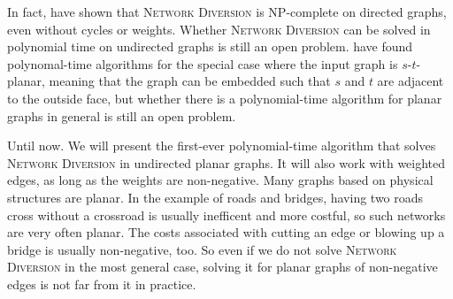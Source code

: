 In fact, \cite{source:theoretical-and-computational-advances-for-network-diversion} have shown that \textsc{Network Diversion} is NP-complete on directed graphs, even without cycles or weights. Whether \textsc{Network Diversion} can be solved in polynomial time on undirected graphs is still an open problem. \cite{source:theoretical-and-computational-advances-for-network-diversion} have found polynomal-time algorithms for the special case where the input graph is $s$-$t$-planar, meaning that the graph can be embedded such that $s$ and $t$ are adjacent to the outside face, but whether there is a polynomial-time algorithm for planar graphs in general is still an open problem.

Until now. We will present the first-ever polynomial-time algorithm that solves \textsc{Network Diversion} in undirected planar graphs. It will also work with weighted edges, as long as the weights are non-negative. Many graphs based on physical structures are planar. In the example of roads and bridges, having two roads cross without a crossroad is usually inefficent and more costful, so such networks are very often planar. The costs associated with cutting an edge or blowing up a bridge is usually non-negative, too. So even if we do not solve \textsc{Network Diversion} in the most general case, solving it for planar graphs of non-negative edges is not far from it in practice.
